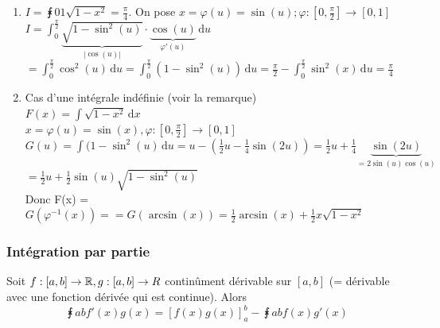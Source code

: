 \documentclass[12pt,a4paper]{article}
\begin{document}
{
\begin{enumerate}
	\item $I = \intx{0}{1}{\sqrt{1-x^2}} = \frac{\pi}{4}$. On pose $x =\varphi(u) = \sin(u); \varphi : [0,\frac{\pi}{2}] \to [0,1]$\\
	$I = \int_0^{\frac{\pi}{2}} \underbrace{\sqrt{1-\sin^2(u)}}_{|\cos(u)|} \cdot \underbrace{\cos(u)}_{\varphi'(u)} \, \mathrm du$\\
	$= \int_0^{\frac{\pi}{2}} \cos^2(u) \, \mathrm du = \int_0^{\frac{\pi}{2}} (1-\sin^2(u)) \, \mathrm du = \frac{\pi}{2} - \int_0^\frac{\pi}{2} \sin^2(x) \, \mathrm du = \frac{\pi}{4}$
	\item Cas d'une intégrale indéfinie (voir la remarque)\\
	$F(x) = \int \sqrt{1-x^2} \, \mathrm dx $\\
	$x = \varphi(u) = \sin(x), \varphi : [0,\frac{\pi}{2}] \to [0,1]$\\
	$G(u) = \int (1-\sin^2(u) \, \mathrm du = u-(\frac{1}{2}u - \frac{1}{4}\sin(2u)) = \frac{1}{2}u + \frac{1}{4}\underbrace{\sin(2u)}_{=2\sin(u)\cos(u)}$\\
	$= \frac{1}{2}u + \frac{1}{2} \sin(u)\sqrt{1-\sin^2(u)}$\\
	Donc F(x) = $G(\varphi^{-1}(x)) =  = G(\arcsin(x)) = \frac{1}{2}\arcsin(x) + \frac{1}{2}x\sqrt{1-x^2}$
\end{enumerate}
\subsubsection{Intégration par partie}
\begin{boite}
	\Theoreme Soit $f: [a,b] \to \mathbb{R}, g : [a,b] \to R$ continûment dérivable sur $[a,b]$ (= dérivable avec une fonction dérivée qui est continue). Alors 
	\begin{equation}
		\intx{a}{b}{f'(x)g(x)} = [f(x)g(x)]_a^b - \intx{a}{b}{f(x)g'(x)}
	\end{equation}


\end{boite}}
\end{document}
